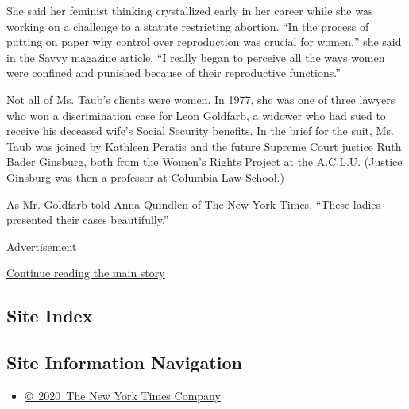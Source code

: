 She said her feminist thinking crystallized early in her career while
she was working on a challenge to a statute restricting abortion. ``In
the process of putting on paper why control over reproduction was
crucial for women,'' she said in the Savvy magazine article, ``I really
began to perceive all the ways women were confined and punished because
of their reproductive functions.''

Not all of Ms. Taub's clients were women. In 1977, she was one of three
lawyers who won a discrimination case for Leon Goldfarb, a widower who
had sued to receive his deceased wife's Social Security benefits. In the
brief for the suit, Ms. Taub was joined by
\href{https://www.aclu.org/files/womensrights/tribute/2.html}{Kathleen
Peratis} and the future Supreme Court justice Ruth Bader Ginsburg, both
from the Women's Rights Project at the A.C.L.U. (Justice Ginsburg was
then a professor at Columbia Law School.)

As
\href{https://www.nytimes3xbfgragh.onion/1977/03/03/archives/leon-goldfarb-doubly-happy-with-decision.html}{Mr.
Goldfarb told Anna Quindlen of The New York Times}, ``These ladies
presented their cases beautifully.''

Advertisement

\protect\hyperlink{after-bottom}{Continue reading the main story}

\hypertarget{site-index}{%
\subsection{Site Index}\label{site-index}}

\hypertarget{site-information-navigation}{%
\subsection{Site Information
Navigation}\label{site-information-navigation}}

\begin{itemize}
\tightlist
\item
  \href{https://help.nytimes3xbfgragh.onion/hc/en-us/articles/115014792127-Copyright-notice}{©~2020~The
  New York Times Company}
\end{itemize}

